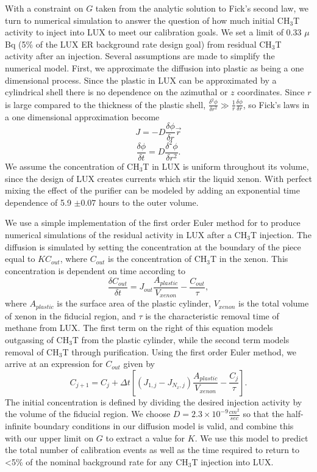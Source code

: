 With a constraint on $G$ taken from the analytic solution to Fick's second law, we turn to numerical simulation to answer the question of how much initial CH$_3$T activity to inject into LUX to meet our calibration goals. We set a limit of 0.33 $\mu$Bq (5\% of the LUX ER background rate design goal) from residual CH$_3$T activity after an injection.  Several assumptions are made to simplify the numerical model.  First, we approximate the diffusion into plastic as being a one dimensional process.  Since the plastic in LUX can be approximated by a cylindrical shell there is no dependence on the azimuthal or $z$ coordinates.  Since $r$ is large compared to the thickness of the plastic shell, $\frac{\delta^2 \phi}{\delta r^2} \gg \frac{1}{r} \frac {\delta \phi}{\delta r}$, so Fick's laws in a one dimensional approximation become
\[J=-D\frac{\delta \phi}{\delta r}\vec{r}\]
\[\frac{\delta \phi}{\delta t} = D \frac{\delta^2 \phi}{\delta r^2}.\]  We assume the concentration of CH$_3$T in LUX is uniform throughout its volume, since the design of LUX creates currents which stir the liquid xenon.  With perfect mixing the effect of the purifier can be modeled by adding an exponential time dependence of 5.9 $\pm 0.07$ hours to the outer volume. 

We use a simple implementation of the first order Euler method for to produce numerical simulations of the residual activity in LUX after a CH$_3$T injection. The diffusion is simulated by setting the concentration at the boundary of the piece equal to $KC_{out}$, where $C_{out}$ is the concentration of CH$_3$T in the xenon.  This concentration is dependent on time according to
\[\frac{\delta C_{out}}{\delta t} = J_{out} \frac{A_{plastic}}{V_{xenon}}-\frac{C_{out}}{\tau},\]
where $A_{plastic}$ is the surface area of the plastic cylinder, $V_{xenon}$ is the total volume of xenon in the fiducial region, and $\tau$ is the characteristic removal time of methane from LUX.  The first term on the right of this equation models outgassing of CH$_3$T from the plastic cylinder, while the second term models removal of CH$_3$T through purification.  Using the first order Euler method, we arrive at an expression for $C_{out}$ given by
\[C_{j+1}=C_j + \Delta t \left[(J_{1,j}-J_{N_x,j})\frac{A_{plastic}}{V_{xenon}}-\frac{C_j}{\tau}\right].\]
The initial concentration is defined by dividing the desired injection activity by the volume of the fiducial region.  We choose $D = 2.3 \times 10^{-9} \frac {cm^2}{sec}$ so that the half-infinite boundary conditions in our diffusion model is valid, and combine this with our upper limit on $G$ to extract a value for $K$.  We use this model to predict the total number of calibration events as well as the time required to return to \textless 5\% of the nominal background rate for any CH$_3$T injection into LUX.  


